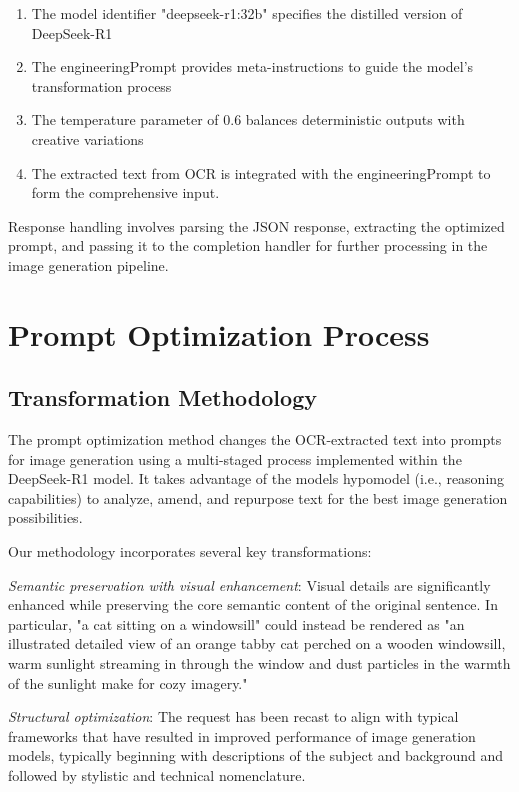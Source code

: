 \begin{enumerate}
 \item The model identifier "deepseek-r1:32b" specifies the distilled version of DeepSeek-R1

 \item The engineeringPrompt provides meta-instructions to guide the model's transformation process

 \item The temperature parameter of 0.6 balances deterministic outputs with creative variations


    \item The extracted text from OCR is integrated with the engineeringPrompt to form the comprehensive input.
\end{enumerate}

Response handling involves parsing the JSON response, extracting the optimized prompt, and passing it to the completion handler for further processing in the image generation pipeline.


\section{Prompt Optimization Process}

\subsection{Transformation Methodology}

The prompt optimization method changes the OCR-extracted text into prompts for image generation using a multi-staged process implemented within the DeepSeek-R1 model. It takes advantage of the models hypomodel (i.e., reasoning capabilities) to analyze, amend, and repurpose text for the best image generation possibilities.


Our methodology incorporates several key transformations:


\textit{Semantic preservation with visual enhancement}: Visual details are significantly enhanced while preserving the core semantic content of the original sentence. In particular, "a cat sitting on a windowsill" could instead be rendered as "an illustrated detailed view of an orange tabby cat perched on a wooden windowsill, warm sunlight streaming in through the window and dust particles in the warmth of the sunlight make for cozy imagery."  

\textit{Structural optimization}: The request has been recast to align with typical frameworks that have resulted in improved performance of image generation models, typically beginning with descriptions of the subject and background and followed by stylistic and technical nomenclature.

